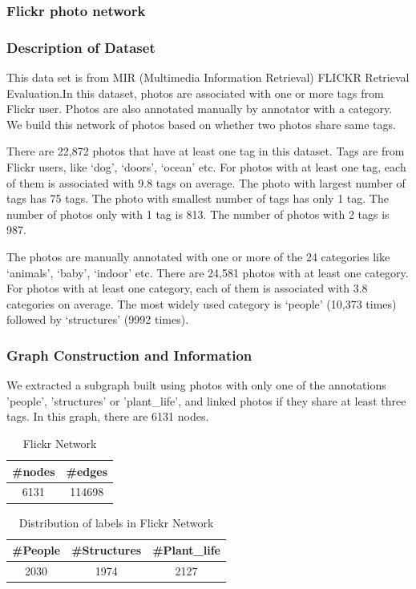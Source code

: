\subsubsection{Flickr photo network}

\subsubsection*{Description of Dataset}
This data set is from MIR (Multimedia Information Retrieval) FLICKR Retrieval Evaluation.In this dataset, photos are associated with one or more tags from Flickr user. Photos are also annotated manually by annotator with a category. We build this network of photos based on whether two photos share same tags. 

There are 22,872 photos that have at least one tag in this dataset. Tags are from Flickr users, like ‘dog’, ‘doors’, ‘ocean’ etc. For photos with at least one tag, each of them is associated with 9.8 tags on average. The photo with largest number of tags has 75 tags. The photo with smallest number of tags has only 1 tag. The number of photos only with 1 tag is 813. The number of photos with 2 tags is 987.

The photos are manually annotated with one or more of the 24 categories like ‘animals’, ‘baby’, ‘indoor’ etc. There are 24,581 photos with at least one category. For photos with at least one category, each of them is associated with 3.8 categories on average.  The most widely used category is ‘people’ (10,373 times) followed by ‘structures’ (9992 times). 

\subsubsection*{Graph Construction and Information}
We extracted a subgraph built using photos with only one of the annotations 'people', 'structures' or 'plant\_life', and linked photos if they share at least three tags. In this graph, there are 6131 nodes. 

\begin{table}[!ht]
\centering
\begin{tabular}{cc}
\toprule
\textbf{\#nodes} & \textbf{\#edges}\\
\midrule
6131 & 114698\\
\bottomrule
\end{tabular}
\caption{Flickr Network}
\end{table}

\begin{table}[!ht]
\centering
\begin{tabular}{ccc}
\toprule
\textbf{\#People} & \textbf{\#Structures} & \textbf{\#Plant\_life}\\
\midrule
2030 & 1974 & 2127\\
\bottomrule
\end{tabular}
\caption{Distribution of labels in Flickr Network}
\end{table}

